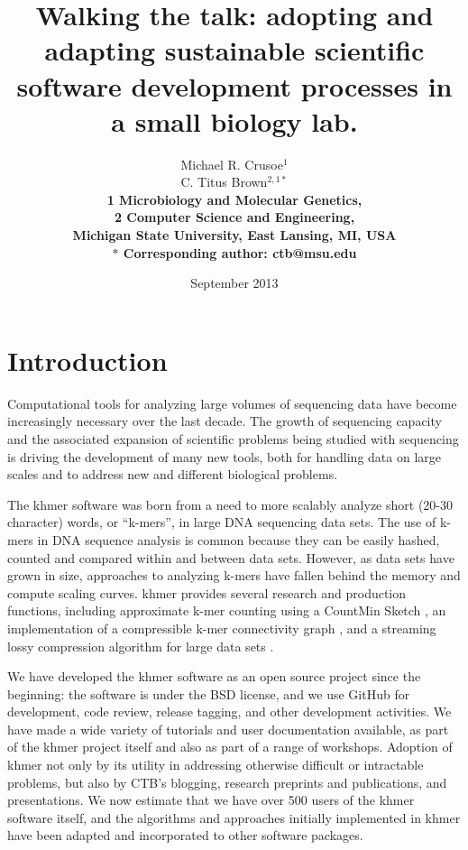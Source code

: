 \documentclass[11pt]{article}
\date{September 2013}
\title{Walking the talk: adopting and adapting sustainable scientific software
  development processes in a small biology lab.}
\author{Michael R. Crusoe$^{1}$\\
C. Titus Brown$^{2,1\ast}$\\
\small \bf{1} Microbiology and Molecular Genetics,\\
\small \bf{2} Computer Science and Engineering,\\
\small Michigan State University, East Lansing, MI, USA\\
\small $\ast$ Corresponding author: ctb@msu.edu}
\begin{document}
\maketitle



\setlength{\parindent}{0pt}
\setlength{\parindent}{0pt}
\setlength{\parskip}{0.70ex}

\section{Introduction}

Computational tools for analyzing large volumes of sequencing data
have become increasingly necessary over the last decade.  The growth
of sequencing capacity and the associated expansion of scientific
problems being studied with sequencing is driving the development of
many new tools, both for handling data on large scales and to address
new and different biological problems.

The khmer software was born from a need to more scalably analyze short
(20-30 character) words, or ``k-mers'', in large DNA sequencing data
sets. The use of k-mers in DNA sequence analysis is common because
they can be easily hashed, counted and compared within and between
data sets.  However, as data sets have grown in size, approaches to
analyzing k-mers have fallen behind the memory and compute scaling
curves.  khmer provides several research and production functions,
including approximate k-mer counting using a CountMin Sketch
\cite{Zhang2013}, an implementation of a compressible k-mer
connectivity graph \cite{Pell2012}, and a streaming lossy compression
algorithm for large data sets \cite{Brown2012}.

We have developed the khmer software as an open source project since
the beginning: the software is under the BSD license, and we use
GitHub for development, code review, release tagging, and other
development activities.  We have made a wide variety of tutorials and
user documentation available, as part of the khmer project itself and
also as part of a range of workshops.  Adoption of khmer not only by
its utility in addressing otherwise difficult or intractable problems,
but also by CTB's blogging, research preprints and publications, and
presentations.  We now estimate that we have over 500 users of the
khmer software itself, and the algorithms and approaches initially
implemented in khmer have been adapted and incorporated to other
software packages.
\end{document}
